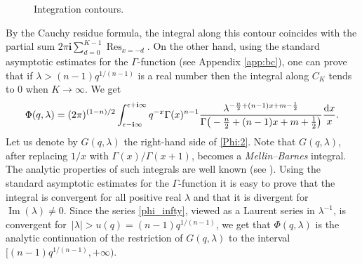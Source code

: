 \documentclass[pdftex]{sigma}
\numberwithin{equation}{section}
\newcommand{\ii}{\mathbf{i}}
\begin{document}
\begin{figure}[t]\centering
{}

\caption{Integration contours.}\label{Phi:contour}
\end{figure}
By the Cauchy
residue formula, the integral along this contour coincides with the
partial sum $2\pi \ii \sum_{d=0}^{K-1} \operatorname{Res}_{x=-d}$. On the
other hand, using the standard asymptotic estimates for the
$\Gamma$-function (see Appendix \ref{app:bc}), one can prove
that if $\lambda>(n-1) q^{1/(n-1)}$
is a real number then the integral along $C_K$
tends to $0$ when $K\to \infty$. We get
\begin{equation}\label{Phi:2}
\Phi(q,\lambda) =
(2\pi)^{(1-n)/2}
\int_{\epsilon -\ii\infty}^{\epsilon + \ii \infty}
q^{-x}\Gamma(x)^{n-1}
\frac{\lambda^{-\frac{n}{2}+(n-1)x+m-\frac{1}{2} } }{
\Gamma\big(-\frac{n}{2}+(n-1)x+m+\frac{1}{2} \big) }
\frac{{\rm d}x}{x}.
\end{equation}
Let us denote by $G(q,\lambda)$ the right-hand side of \eqref{Phi:2}. Note that $G(q,\lambda)$, after replacing $1/x$ with $\Gamma(x)/\Gamma(x+1)$, becomes a {\em Mellin--Barnes} integral. The analytic properties of such integrals are well known (see \cite{Bat,PK2001}). Using the standard asymptotic estimates for the $\Gamma$-function it is easy to prove that the integral is convergent for all positive real $\lambda$ and that it is divergent for $\operatorname{Im}(\lambda)\neq 0$. Since the series \eqref{phi_infty}, viewed as a Laurent series in $\lambda^{-1}$, is convergent for~${|\lambda|>u(q)=(n-1) q^{1/(n-1)}}$, we get that $\Phi(q,\lambda)$ is the analytic continuation of the restriction of $G(q,\lambda)$ to the interval $\big[(n-1) q^{1/{(n-1)}}, +\infty\big)$.
\end{document}
